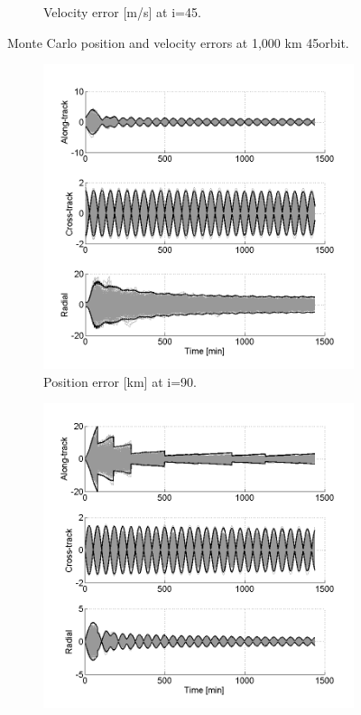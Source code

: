 \documentclass[]{aiaa-tc}%
\begin{document}
\begin{figure}[h!]
\begin{subfigure}{.49\textwidth}
		\caption{Velocity error [m/s] at i=45\degree.}
		\label{fig:coastline}
	\end{subfigure}
	\caption{Monte Carlo position and velocity errors at 1,000 km 45\degree orbit.}
	\label{fig:mcvel45}
\end{figure}
\begin{figure}[h!]
	\centering
	\begin{subfigure}{.49\textwidth}
		\centering
		\includegraphics{MC_pos90}
		\caption{Position error [km] at i=90\degree.}
		\label{fig:mcpos90}
	\end{subfigure}%
	\begin{subfigure}{.49\textwidth} 
		\centering
		\includegraphics{MC_vel90}

\end{subfigure}
\end{figure}
\end{document}
